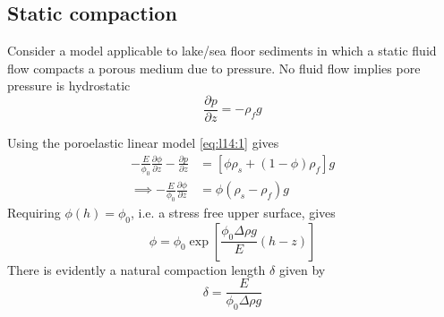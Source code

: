 \documentclass{jknotes}
\begin{document}
\subsection{Static compaction}
Consider a model applicable to lake/sea floor sediments in which a static
fluid flow compacts a porous medium due to pressure. No fluid flow implies
pore pressure is hydrostatic
\begin{equation}
	\frac{\partial p}{\partial z} = -\rho_f g
\end{equation}
\begin{center}
\end{center}
Using the poroelastic linear model \eqref{eq:l14:1} gives
\begin{align}
	-\frac{E}{\phi_0}\frac{\partial \phi}{\partial z} - \frac{\partial
	p}{\partial z} &= \left[ \phi \rho_s + (1-\phi)\rho_f\right] g \\
	\implies -\frac{E}{\phi_0}\frac{\partial \phi}{\partial z} &= \phi(\rho_s
	- \rho_f) g
\end{align}
Requiring $\phi(h) = \phi_0$, i.e. a stress free upper surface, gives
\begin{equation}
	\phi = \phi_0 \exp\left[\frac{\phi_0 \Delta \rho g }{E} (h-z)\right]
\end{equation}
There is evidently a natural compaction length $\delta$ given by
\begin{equation}
	\delta = \frac{E}{\phi_0 \Delta \rho g}
\end{equation}
\end{document}

